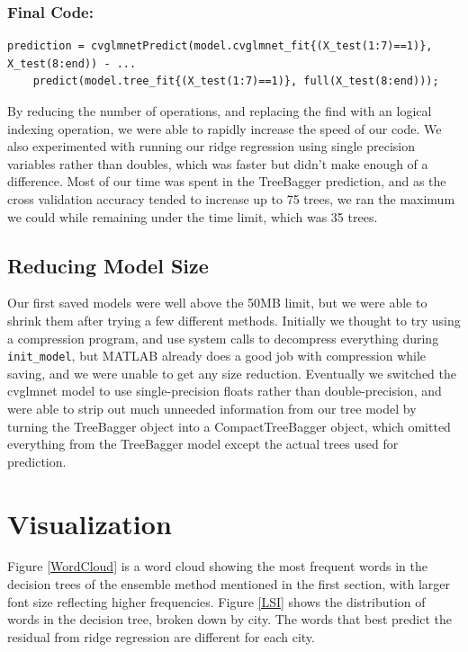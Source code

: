 \documentclass[11pt]{article}
\begin{document}
\subsubsection*{Final Code:}
\begin{lstlisting}
prediction = cvglmnetPredict(model.cvglmnet_fit{(X_test(1:7)==1)}, X_test(8:end)) - ...
	predict(model.tree_fit{(X_test(1:7)==1)}, full(X_test(8:end)));
\end{lstlisting}

By reducing the number of operations, and replacing the find with an logical indexing operation, we were able to rapidly increase the speed of our code. We also experimented with running our ridge regression using single precision variables rather than doubles, which was faster but didn't make enough of a difference. Most of our time was spent in the TreeBagger prediction, and as the cross validation accuracy tended to increase up to 75 trees, we ran the maximum we could while remaining under the time limit, which was 35 trees.

\subsection{Reducing Model Size}
Our first saved models were well above the 50MB limit, but we were able to shrink them after trying a few different methods. Initially we thought to try using a compression program, and use system calls to decompress everything during \texttt{init\_model}, but MATLAB already does a good job with compression while saving, and we were unable to get any size reduction. Eventually we switched the cvglmnet model to use single-precision floats rather than double-precision, and were able to strip out much unneeded information from our tree model by turning the TreeBagger object into a CompactTreeBagger object, which omitted everything from the TreeBagger model except the actual trees used for prediction. 

\section{Visualization}
Figure \ref{WordCloud} is a word cloud showing the most frequent words in the decision trees of the ensemble method mentioned in the first section, with larger font size reflecting higher frequencies. Figure \ref{LSI} shows the distribution of words in the decision tree, broken down by city. The words that best predict the residual from ridge regression are different for each city.
\end{document}
